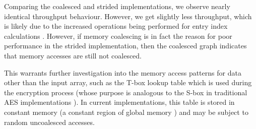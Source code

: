\documentclass[conference,10pt]{IEEEtran}
\begin{document}
Comparing the coalesced and strided implementations, we observe nearly identical throughput 
behaviour.  However, we get slightly less throughput, which is likely due to the increased 
operations being performed for entry index calculations \cite{opencl_guide}.  However, if memory 
coalescing is in fact the reason for poor performance in the strided implementation, then the 
coalesced graph indicates that memory accesses are still not coalesced.  

This warrants further investigation into the memory access patterns for data other than the input 
array, such as the T-box lookup table which is used during the encryption process (whose purpose is 
analogous to the S-box in traditional AES implementations \cite{aes1,aes2}).  In current 
implementations, this table is stored in constant memory (a constant region of global memory 
\cite{opencl_guide}) and may be subject to random uncoalesced accesses.



%
%


%
\end{document}

